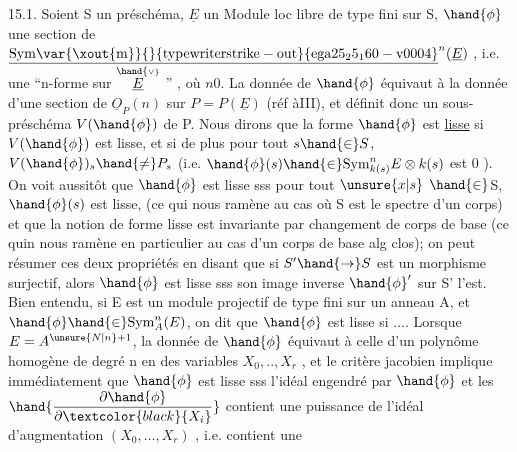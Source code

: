 15.1. Soient S un préschéma, $\underline{E}$ un Module loc libre de type fini
sur S, $\hand{\phi}$ une section de $\underline{\mathrm{Sym\var{\xout{m}}{}{typewriter strike-out}{ega25_25_160-v0004}}}^n(\underline{E})$ , i.e. une ``n-forme sur $\overset{\hand{\scriptscriptstyle\vee}}{\underline{E}}$ '' , où $n$$0$.
La donnée de $\hand{\phi}$ équivaut à la donnée d'une section de $\underline{O}_P(n)$ sur $P=P(\underline{E})$
(réf àIII), et définit donc un sous-préschéma $V(\hand{\phi})$ de P. Nous dirons que
la forme $\hand{\phi}$ est \uline{lisse} si $V(\hand{\phi})$ est lisse, et si de plus pour tout $s\hand{\in} S$,
$V(\hand{\phi})_s\hand{\neq} P_s$ (i.e. $\hand{\phi}(s)\hand{\in} \mathrm{Sym}^n_{k(s)}E\otimes k(s)$ est \hand{\unsure{(}}$0$ ). On voit aussitôt
que $\hand{\phi}$ est lisse sss pour tout $\unsure{x|s}$ $\hand{\in}$S, $\hand{\phi}(s)$ est lisse, 
(ce qui nous ramène au cas où S est le spectre d'un corps) et
que la notion de forme lisse est invariante par changement de corps de
base (ce quin nous ramène en particulier au cas d'un corps de base alg
clos); on peut résumer ces deux propriétés en disant que si $S'\hand{\to} S$ est
un morphisme surjectif, alors $\hand{\phi}$ est lisse sss son image inverse $\hand{\phi}'$ sur S'
l'est. Bien entendu, si E est un module projectif de type fini sur un
anneau A, et $\hand{\phi}\hand{\in}\mathrm{Sym}^n_A(E)$, on dit que $\hand{\phi}$ est lisse si .... Lorsque $E=A^{\unsure{N|n}+1}$,
la donnée de $\hand{\phi}$ équivaut à celle d'un polynôme homogène de degré n
en des variables $X_0,..,X_r$ , et le critère jacobien implique immédiatement
que  $\hand{\phi}$ est lisse sss l'idéal engendré par $\hand{\phi}$ et les $\hand{\dfrac{\partial\hand{\phi}}{\partial\textcolor{black}{X_i}}}$ contient
une puissance de l'idéal d'augmentation $(X_0,\dots,X_r)$ , i.e. contient une

 

